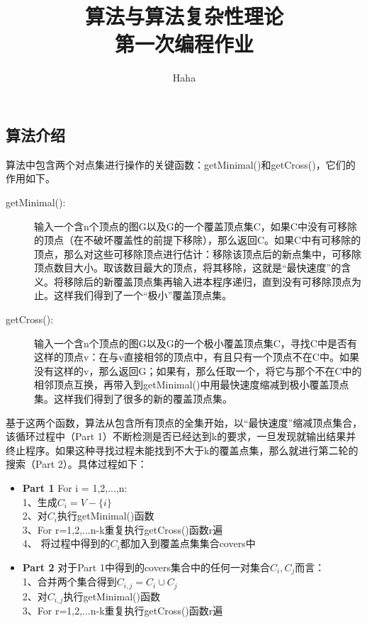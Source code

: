 ﻿\documentclass{article}
\begin{document}
\begin{CJK*}{GBK}{song}
\title{算法与算法复杂性理论\\ 第一次编程作业}
\author{Haha}
\maketitle

\section{算法介绍}
\qquad 算法中包含两个对点集进行操作的关键函数：getMinimal()和getCross()，它们的作用如下。

\begin{description}
\item[getMinimal():] 输入一个含n个顶点的图G以及G的一个覆盖顶点集C，如果C中没有可移除的顶点（在不破坏覆盖性的前提下移除），那么返回C。如果C中有可移除的顶点，那么对这些可移除顶点进行估计：移除该顶点后的新点集中，可移除顶点数目大小。取该数目最大的顶点，将其移除，这就是“最快速度”的含义。将移除后的新覆盖顶点集再输入进本程序递归，直到没有可移除顶点为止。这样我们得到了一个“极小”覆盖顶点集。

\item[getCross():] 输入一个含n个顶点的图G以及G的一个极小覆盖顶点集C，寻找C中是否有这样的顶点v：在与v直接相邻的顶点中，有且只有一个顶点不在C中。如果没有这样的v，那么返回G；如果有，那么任取一个，将它与那个不在C中的相邻顶点互换，再带入到getMinimal()中用最快速度缩减到极小覆盖顶点集。这样我们得到了很多的新的覆盖顶点集。

\end{description}

基于这两个函数，算法从包含所有顶点的全集开始，以“最快速度”缩减顶点集合，该循环过程中（Part 1）不断检测是否已经达到k的要求，一旦发现就输出结果并终止程序。如果这种寻找过程未能找到不大于k的覆盖点集，那么就进行第二轮的搜索（Part 2）。具体过程如下：

\begin{itemize}
\item \textbf{Part 1} For i = 1,2,...,n:\\ 1、生成$C_i=V-\{i\}$\\ 2、对$C_i$执行getMinimal()函数\\ 3、For r=1,2,...n-k重复执行getCross()函数r遍\\ 4、 将过程中得到的$C_i$都加入到覆盖点集集合covers中

\item \textbf{Part 2} 对于Part 1中得到的covers集合中的任何一对集合$C_i,C_j$而言：\\ 1、合并两个集合得到$C_{i,j}=C_i\cup C_j$\\ 2、对$C_{i,j}$执行getMinimal()函数\\ 3、For r=1,2,...n-k重复执行getCross()函数r遍


\end{itemize}
\end{CJK*}
\end{document}

